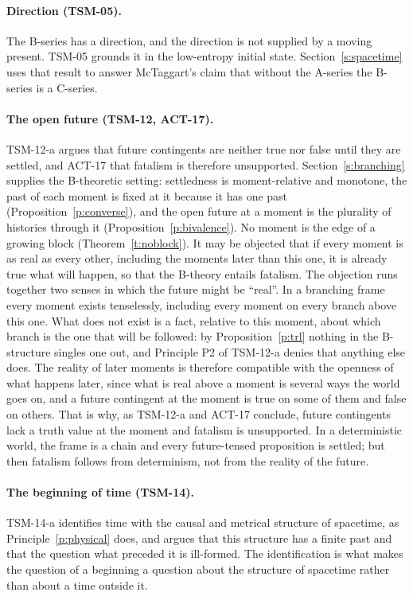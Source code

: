 \documentclass{situationist-preprint}
\begin{document}
\paragraph{Direction (TSM-05).} The B-series has a direction, and the direction is not supplied by a moving present. TSM-05 grounds it in the low-entropy initial state. Section~\ref{s:spacetime} uses that result to answer McTaggart's claim that without the A-series the B-series is a C-series.

\paragraph{The open future (TSM-12, ACT-17).} TSM-12-a argues that future contingents are neither true nor false until they are settled, and ACT-17 that fatalism is therefore unsupported. Section~\ref{s:branching} supplies the B-theoretic setting: settledness is moment-relative and monotone, the past of each moment is fixed at it because it has one past (Proposition~\ref{p:converse}), and the open future at a moment is the plurality of histories through it (Proposition~\ref{p:bivalence}). No moment is the edge of a growing block (Theorem~\ref{t:noblock}). It may be objected that if every moment is as real as every other, including the moments later than this one, it is already true what will happen, so that the B-theory entails fatalism. The objection runs together two senses in which the future might be \enquote{real}. In a branching frame every moment exists tenselessly, including every moment on every branch above this one. What does not exist is a fact, relative to this moment, about which branch is the one that will be followed: by Proposition~\ref{p:trl} nothing in the B-structure singles one out, and Principle P2 of TSM-12-a denies that anything else does. The reality of later moments is therefore compatible with the openness of what happens later, since what is real above a moment is several ways the world goes on, and a future contingent at the moment is true on some of them and false on others. That is why, as TSM-12-a and ACT-17 conclude, future contingents lack a truth value at the moment and fatalism is unsupported. In a deterministic world, the frame is a chain and every future-tensed proposition is settled; but then fatalism follows from determinism, not from the reality of the future.

\paragraph{The beginning of time (TSM-14).} TSM-14-a identifies time with the causal and metrical structure of spacetime, as Principle~\ref{p:physical} does, and argues that this structure has a finite past and that the question what preceded it is ill-formed. The identification is what makes the question of a beginning a question about the structure of spacetime rather than about a time outside it.
\end{document}
